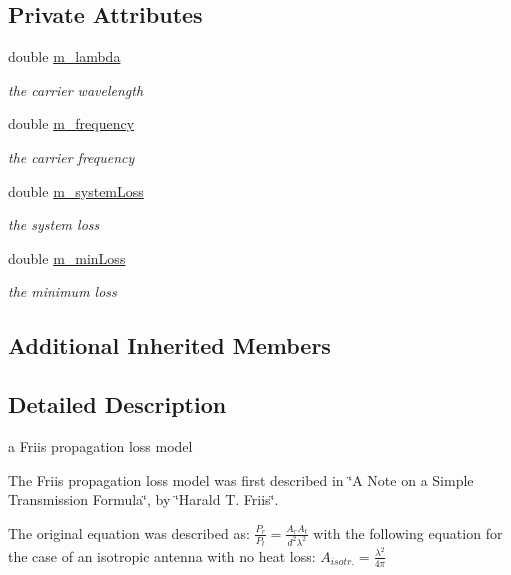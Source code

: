 \subsection*{Private Attributes}
\begin{DoxyCompactItemize}
\item 
double \hyperlink{classns3_1_1FriisPropagationLossModel_a28e4560ba2a05fa63bd2bcc341a7967b}{m\+\_\+lambda}
\begin{DoxyCompactList}\small\item\em the carrier wavelength \end{DoxyCompactList}\item 
double \hyperlink{classns3_1_1FriisPropagationLossModel_a4bb14f42a54c502525911272b19dd35f}{m\+\_\+frequency}
\begin{DoxyCompactList}\small\item\em the carrier frequency \end{DoxyCompactList}\item 
double \hyperlink{classns3_1_1FriisPropagationLossModel_ad547e83f7bdb1f4ba7205909886f16f3}{m\+\_\+system\+Loss}
\begin{DoxyCompactList}\small\item\em the system loss \end{DoxyCompactList}\item 
double \hyperlink{classns3_1_1FriisPropagationLossModel_ae390ab5b83634ed3f5fec7e00fea705d}{m\+\_\+min\+Loss}
\begin{DoxyCompactList}\small\item\em the minimum loss \end{DoxyCompactList}\end{DoxyCompactItemize}
\subsection*{Additional Inherited Members}


\subsection{Detailed Description}
a Friis propagation loss model 

The Friis propagation loss model was first described in \char`\"{}\+A Note on a Simple Transmission Formula\char`\"{}, by \char`\"{}\+Harald T. Friis\char`\"{}.

The original equation was described as\+: $ \frac{P_r}{P_t} = \frac{A_r A_t}{d^2\lambda^2} $ with the following equation for the case of an isotropic antenna with no heat loss\+: $ A_{isotr.} = \frac{\lambda^2}{4\pi} $

